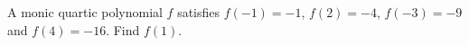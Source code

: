 A monic quartic polynomial $f$ satisfies $f(-1)=-1$, $f(2)=-4$, $f(-3)=-9$ and $f(4)=-16$. Find $f(1)$.
